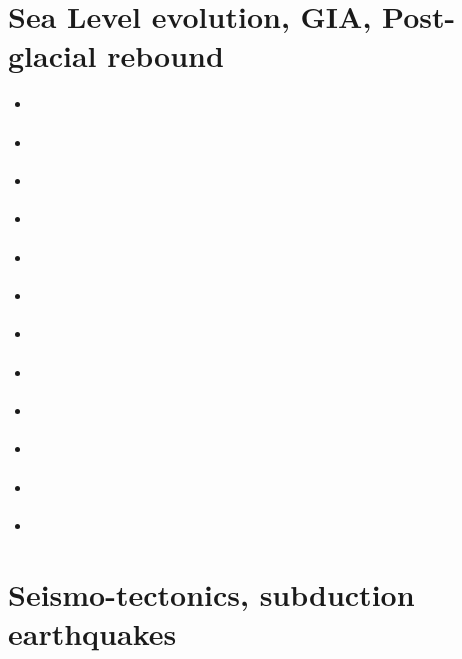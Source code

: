 \section{Sea Level evolution, GIA, Post-glacial rebound}

\begin{scriptsize}
\begin{itemize}
\item[\nineteenseventyeight] 
\textcite{pefc78} 
\item[\twothousandseven] 
\textcite{zhpw03} 
\item[\twothousandseven] 
\textcite{pazw05} 
\item[\twothousandseven] 
\textcite{pazw07} 
\item[\twothousandnine] 
\textcite{cohu09} 
\item[\twothousandeleven] 
\textcite{spbk11} 
\item[\twothousandthirteen] 
\textcite{conr13} 
\textcite{ivjw13} 
\textcite{awzh13} 
\item[\twothousandfourteen] 
\textcite{larp14} 
\item[\twothousandeighteen] 
\textcite{makv18} 
\item[\twothousandnineteen] 
\textcite{halk19} 
\item[\twothousandtwentyone]
\textcite{arpb21} 
\item[\twothousandtwentytwo]
\textcite{kaza22} 
\end{itemize}
\end{scriptsize}



\section{Seismo-tectonics, subduction earthquakes}

